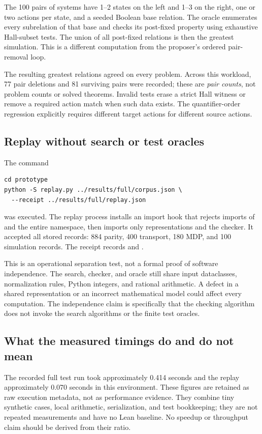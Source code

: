 The 100 pairs of systems have 1--2 states on the left and 1--3 on the right,
one or two actions per state, and a seeded Boolean base relation. The oracle
enumerates every subrelation of that base and checks its post-fixed property
using exhaustive Hall-subset tests. The union of all post-fixed relations is
then the greatest simulation. This is a different computation from the
proposer's ordered pair-removal loop.

The resulting greatest relations agreed on every problem. Across this workload,
77 pair deletions and 81 surviving pairs were recorded; these are
\emph{pair counts}, not problem counts or solved theorems. Invalid tests erase
a strict Hall witness or remove a required action match when such data exists.
The quantifier-order regression explicitly requires different target actions
for different source actions.

\subsection{Replay without search or test oracles}

The command
\begin{lstlisting}
cd prototype
python -S replay.py ../results/full/corpus.json \
  --receipt ../results/full/replay.json
\end{lstlisting}
was executed. The replay process installs an import hook that rejects imports
of \code{forge_ap.search} and the entire \code{tests} namespace, then imports
only representations and the checker. It accepted all stored records:
884 parity, 400 transport, 180 MDP, and 100 simulation records. The receipt
records \code{search_imports = FORBIDDEN} and
.

This is an operational separation test, not a formal proof of software
independence. The search, checker, and oracle still share input dataclasses,
normalization rules, Python integers, and rational arithmetic. A defect in a
shared representation or an incorrect mathematical model could affect every
computation. The independence claim is specifically that the checking
algorithm does not invoke the search algorithms or the finite test oracles.

\subsection{What the measured timings do and do not mean}

The recorded full test run took approximately 0.414 seconds and the replay
approximately 0.070 seconds in this environment. These figures are retained
as raw execution metadata, not as performance evidence. They combine tiny
synthetic cases, local arithmetic, serialization, and test bookkeeping; they
are not repeated measurements and have no Lean baseline. No speedup or
throughput claim should be derived from their ratio.

